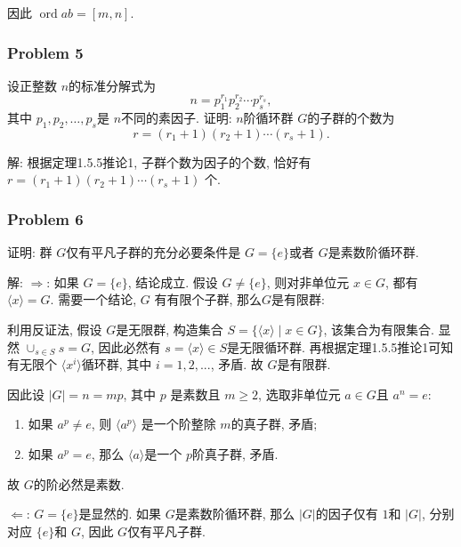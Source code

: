 \documentclass[a4paper,12pt]{ctexart}
\newcommand{\ord}{\operatorname{ord}}
\begin{document}
    因此 $ \ord ab=[m,n] $.

\subsubsection*{Problem 5}
  设正整数 $ n $的标准分解式为 
  \[n=p_1^{r_1}p_2^{r_2}\cdots p_s^{r_s},\]
  其中 $ p_1,p_2,\dots,p_s  $是 $ n $不同的素因子. 证明: $ n $阶循环群 $ G $的子群的个数为 
  \[r=(r_1+1)(r_2+1)\cdots (r_s+1).\]

  解: 根据定理1.5.5推论1, 子群个数为因子的个数, 恰好有  $ r=(r_1+1)(r_2+1)\cdots (r_s+1) $ 个.

\subsubsection*{Problem 6}
    证明: 群 $ G $仅有平凡子群的充分必要条件是 $ G=\{e\} $或者 $ G $是素数阶循环群.

    解: $ \Rightarrow $: 如果 $ G=\{e\} $, 结论成立. 假设 $ G\ne\{e\} $, 则对非单位元 $ x\in G $, 
    都有$ \langle x\rangle=G $. 
    需要一个结论, $ G $ 有有限个子群, 那么$ G $是有限群: 
    
    利用反证法, 
    假设 $ G $是无限群, 构造集合 $ S= \{\langle x\rangle\mid x\in G\} $, 该集合为有限集合. 
    显然 $ \cup_{s\in S}s = G $, 因此必然有 $ s=\langle x\rangle\in S $是无限循环群. 
    再根据定理1.5.5推论1可知有无限个 $ \langle x^i\rangle $循环群, 其中 $ i=1,2,... $, 矛盾. 故 $ G $是有限群.

    因此设 $ |G|=n=mp $, 其中 $ p $ 是素数且 $ m\ge 2 $, 选取非单位元 $ a\in G $且 $ a^n=e $:
    \begin{enumerate}
      \item 如果 $ a^p\ne e $, 则 $ \langle a^p\rangle $ 是一个阶整除 $ m $的真子群, 矛盾;
      \item 如果 $ a^p=e $, 那么 $ \langle a\rangle $是一个 $ p $阶真子群, 矛盾.
    \end{enumerate} 
    故 $ G $的阶必然是素数.
    
    $ \Leftarrow $: $ G=\{e\} $是显然的. 如果 $ G $是素数阶循环群, 那么 $ |G| $的因子仅有 $ 1 $和 $ |G| $, 
    分别对应 $ \{e\} $和  $ G $, 因此 $ G $仅有平凡子群. 
\end{document}
